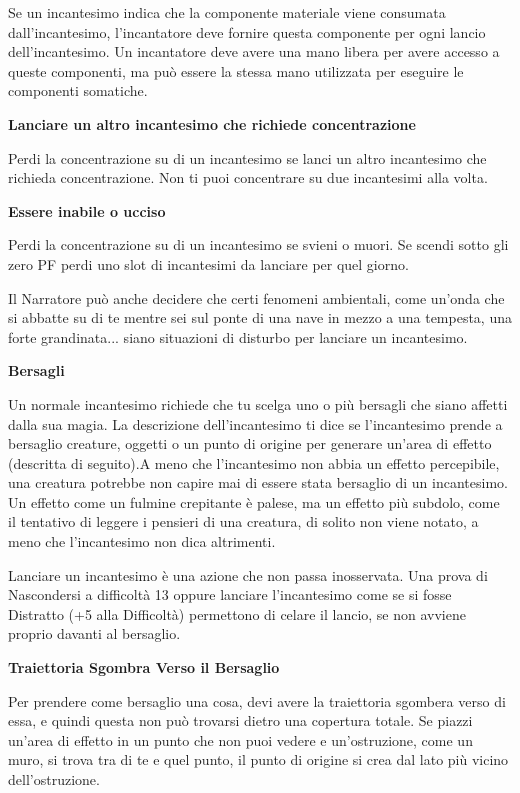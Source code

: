 \begin{multicols}{2}
Se un incantesimo indica che la componente materiale viene consumata dall'incantesimo, l'incantatore deve fornire questa componente per ogni lancio dell'incantesimo.
Un incantatore deve avere una mano libera per avere accesso a queste componenti, ma può essere la stessa mano utilizzata per eseguire le componenti somatiche.

\medskip

\textbf{Lanciare un altro incantesimo che richiede concentrazione}

Perdi la concentrazione su di un incantesimo se lanci un altro incantesimo che richieda concentrazione. Non ti puoi concentrare su due incantesimi alla volta. 


\medskip

\textbf{Essere inabile o ucciso}

Perdi la concentrazione su di un incantesimo se svieni o muori. Se scendi sotto gli zero PF perdi uno slot di incantesimi da lanciare per quel giorno.

\medskip

Il Narratore può anche decidere che certi fenomeni ambientali, come un'onda che si abbatte su di te mentre sei sul ponte di una nave in mezzo a una tempesta, una forte grandinata... siano situazioni di disturbo per lanciare un incantesimo.

\medskip

\textbf{Bersagli}

Un normale incantesimo richiede che tu scelga uno o più bersagli che siano affetti dalla sua magia. La descrizione dell'incantesimo ti dice se l'incantesimo prende a bersaglio creature, oggetti o un punto di origine per generare un'area di effetto (descritta di seguito).A meno che l'incantesimo non abbia un effetto percepibile, una creatura potrebbe non capire mai di essere stata bersaglio di un incantesimo. Un effetto come un fulmine crepitante è palese, ma un effetto più subdolo, come il tentativo di leggere i pensieri di una creatura, di solito non viene notato, a meno che l'incantesimo non dica altrimenti.

Lanciare un incantesimo è una azione che non passa inosservata. Una prova di Nascondersi a difficoltà 13 oppure lanciare l'incantesimo come se si fosse Distratto (+5 alla Difficoltà) permettono di celare il lancio, se non avviene proprio davanti al bersaglio.

\textbf{Traiettoria Sgombra Verso il Bersaglio}

Per prendere come bersaglio una cosa, devi avere la traiettoria sgombera verso di essa, e quindi questa non può trovarsi dietro una copertura totale. Se piazzi un'area di effetto in un punto che non puoi vedere e un'ostruzione, come un muro, si trova tra di te e quel punto, il punto di origine si crea dal lato più vicino dell'ostruzione.


\end{multicols}
